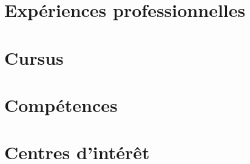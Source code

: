 



\maketitle

\vspace{-1cm}
\section{Expériences professionnelles}
	

\section{Cursus}
	


	
\section{Compétences}
	
	
%	
	
\section{Centres d'intér\^et}
	

%	

